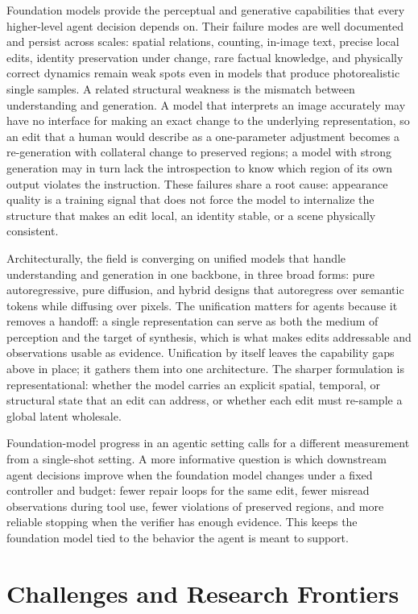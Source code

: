 Foundation models provide the perceptual and generative capabilities that every higher-level agent decision depends on. Their failure modes are well documented and persist across scales: spatial relations, counting, in-image text, precise local edits, identity preservation under change, rare factual knowledge, and physically correct dynamics remain weak spots even in models that produce photorealistic single samples. A related structural weakness is the mismatch between understanding and generation. A model that interprets an image accurately may have no interface for making an exact change to the underlying representation, so an edit that a human would describe as a one-parameter adjustment becomes a re-generation with collateral change to preserved regions; a model with strong generation may in turn lack the introspection to know which region of its own output violates the instruction. These failures share a root cause: appearance quality is a training signal that does not force the model to internalize the structure that makes an edit local, an identity stable, or a scene physically consistent.

Architecturally, the field is converging on unified models that handle understanding and generation in one backbone, in three broad forms: pure autoregressive, pure diffusion, and hybrid designs that autoregress over semantic tokens while diffusing over pixels. The unification matters for agents because it removes a handoff: a single representation can serve as both the medium of perception and the target of synthesis, which is what makes edits addressable and observations usable as evidence. Unification by itself leaves the capability gaps above in place; it gathers them into one architecture. The sharper formulation is representational: whether the model carries an explicit spatial, temporal, or structural state that an edit can address, or whether each edit must re-sample a global latent wholesale.

Foundation-model progress in an agentic setting calls for a different measurement from a single-shot setting. A more informative question is which downstream agent decisions improve when the foundation model changes under a fixed controller and budget: fewer repair loops for the same edit, fewer misread observations during tool use, fewer violations of preserved regions, and more reliable stopping when the verifier has enough evidence. This keeps the foundation model tied to the behavior the agent is meant to support.

\fi
\section{Challenges and Research Frontiers}
\label{sec:frontiers}

